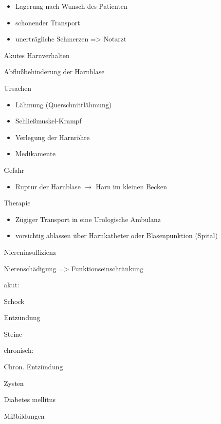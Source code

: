 \documentclass{article}
\begin{document}
\begin{itemize}
\item Lagerung nach Wunsch des Patienten

\item schonender Transport

\item unertr\"agliche Schmerzen ={\textgreater} Notarzt

\end{itemize}
Akutes Harnverhalten

Abflu{\ss}behinderung der Harnblase

Ursachen

\begin{itemize}
\item L\"ahmung (Querschnittl\"ahmung)

\item Schlie{\ss}muskel-Krampf

\item Verlegung der Harnr\"ohre

\item Medikamente

\end{itemize}
Gefahr

\begin{itemize}
\item Ruptur der Harnblase ${\rightarrow}$ Harn im kleinen Becken

\end{itemize}
Therapie

\begin{itemize}
\item Z\"ugiger Transport in eine Urologische Ambulanz

\item vorsichtig ablassen \"uber Harnkatheter oder Blasenpunktion
(Spital)

\end{itemize}
Niereninsuffizienz

Nierensch\"adigung ={\textgreater}  Funktionseinschr\"ankung

akut:

Schock

Entz\"undung

Steine

chronisch:

Chron. Entz\"undung

Zysten

Diabetes mellitus

Mi{\ss}bildungen
\end{document}
